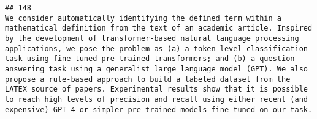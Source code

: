 \documentclass[
]{article}
\begin{document}
\begin{verbatim}
## 148                                                                                                                                                                                                                                                                                                                                                                                                                                                                                                                                                                                                                                                                                                                                                                                                                                                                                                                                                                                                                                                                                                                                                                                                                                                     We consider automatically identifying the defined term within a mathematical definition from the text of an academic article. Inspired by the development of transformer-based natural language processing applications, we pose the problem as (a) a token-level classification task using fine-tuned pre-trained transformers; and (b) a question-answering task using a generalist large language model (GPT). We also propose a rule-based approach to build a labeled dataset from the LATEX source of papers. Experimental results show that it is possible to reach high levels of precision and recall using either recent (and expensive) GPT 4 or simpler pre-trained models fine-tuned on our task.

\end{verbatim}
\end{document}
